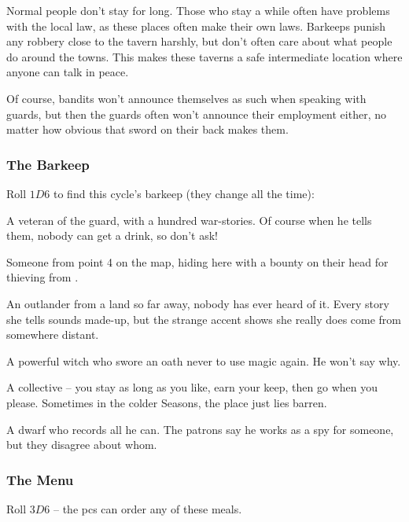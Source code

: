 \begin{multicols}{2}
Normal people don't stay for long.
Those who stay a while often have problems with the local
law, as these places often make their own laws.
Barkeeps punish any robbery close to the tavern harshly, but don't often care about what people do around the towns.
This makes these taverns a safe intermediate location where anyone can talk in peace.

Of course, bandits won't announce themselves as such when speaking with \glspl{guard}, but then the \glspl{guard} often won't announce their employment either, no matter how obvious that sword on their back makes them.

\subsubsection{The Barkeep}

Roll $1D6$ to find this \gls{cycle}'s barkeep (they change all the time):

\begin{dlist}
  \item
  A veteran of the \gls{guard}, with a hundred war-stories. Of course
  when he tells them, nobody can get a drink, so don't ask!
  \item
  Someone from point 4 on the map, hiding here with a bounty on their head for thieving from .
  \item
  An outlander from a land so far away, nobody has ever heard of it.
  Every story she tells sounds made-up, but the strange accent shows she really does come from somewhere distant.
  \item
  A powerful \gls{witch} who swore an oath never to use magic again.
  He won't say why.
  \item
  A collective -- you stay as long as you like, earn your keep, then go
  when you please. Sometimes in the colder Seasons, the place just lies
  barren.
  \item
  A dwarf who records all he can.
  The patrons say he works as a spy for someone, but they disagree about whom.
\end{dlist}

\subsubsection{The Menu}

Roll $3D6$ -- the \glspl{pc} can order any of these meals.

\newcommand\menuItem[3][(\arabic{r12} \glspl{cp})]{%
  \item
  \textbf{#2:}
  #3
  \randomize%
  #1
}


\end{multicols}
